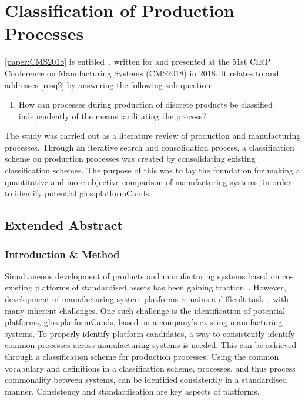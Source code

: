 \section{Classification of Production Processes}\label{sec:clsfProc}
\cref{paper:CMS2018} is entitled~, written for and presented at the 51st CIRP Conference on Manufacturing Systems (CMS2018) in 2018.
It relates to and addresses \cref{resq2} by answering the following sub-question:
\begin{enumerate}[leftmargin=3em, label=RQ2.\arabic*]
    \item How can processes during production of discrete products be classified independently of the means facilitating the process?
\end{enumerate}
The study was carried out as a literature review of production and manufacturing processes.
Through an iterative search and consolidation process, a classification scheme on production processes was created by consolidating existing classification schemes.
The purpose of this was to lay the foundation for making a quantitative and more objective comparison of manufacturing systems, in order to identify potential \gls{glos:platformCand}s.

\subsection{Extended Abstract}
\subsubsection*{Introduction \& Method}
Simultaneous development of products and manufacturing systems based on co-existing platforms of standardised assets has been gaining traction~\parencite{MichaelisJohannesson,ElMaraghy2015407}.
However, development of manufacturing system platforms remains a difficult task~\parencite{BossenPbCd}, with many inherent challenges.
One such challenge is the identification of potential platforms, \ie{} \gls{glos:platformCand}s, based on a company's existing manufacturing systems.
To properly identify platform candidates, a way to consistently identify common processes across manufacturing systems is needed.
This can be achieved through a classification scheme for production processes.
Using the common vocabulary and definitions in a classification scheme, processes, and thus process commonality between systems, can be identified consistently in a standardised manner.
Consistency and standardisation are key aspects of platforms.


